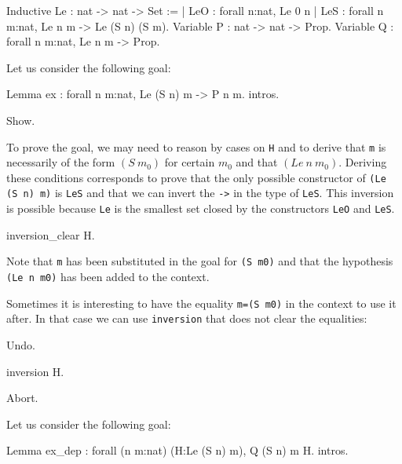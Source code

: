 \begin{coq_example*}
\begin{coq_example*}
Inductive Le : nat -> nat -> Set :=
  | LeO : forall n:nat, Le 0 n
  | LeS : forall n m:nat, Le n m -> Le (S n) (S m).
Variable P : nat -> nat -> Prop.
Variable Q : forall n m:nat, Le n m -> Prop.
\end{coq_example*}

Let us consider the following goal:

\begin{coq_eval}
Lemma ex : forall n m:nat, Le (S n) m -> P n m.
intros.
\end{coq_eval}

\begin{coq_example}
Show.
\end{coq_example}

To prove the goal, we may need to reason by cases on \texttt{H} and to
derive that \texttt{m} is necessarily of
the form $(S~m_0)$ for certain $m_0$ and that $(Le~n~m_0)$.
Deriving these conditions corresponds to prove that the
only possible constructor of \texttt{(Le (S n) m)} is
\texttt{LeS} and that we can invert the
\texttt{->} in the type  of \texttt{LeS}.
This inversion is possible because \texttt{Le} is the smallest set closed by
the constructors \texttt{LeO} and \texttt{LeS}.

\begin{coq_example}
inversion_clear H.
\end{coq_example}

Note that \texttt{m} has been substituted in the goal for \texttt{(S m0)}
and that the hypothesis \texttt{(Le n m0)} has been added to the
context.

Sometimes it is
interesting to have the equality \texttt{m=(S m0)} in the
context to use it after. In that case we can use \texttt{inversion} that
does not clear the equalities:

\begin{coq_eval}
Undo.
\end{coq_eval}

\begin{coq_example}
inversion H.
\end{coq_example}

\begin{coq_eval}
Abort.
\end{coq_eval}


Let us consider the following goal:

\begin{coq_eval}
Lemma ex_dep : forall (n m:nat) (H:Le (S n) m), Q (S n) m H.
intros.
\end{coq_eval}


\end{coq_example*}
